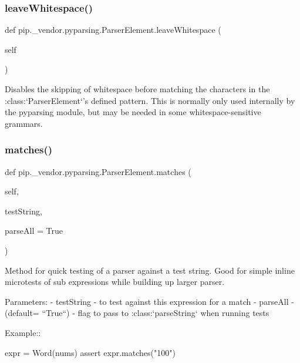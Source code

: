 \subsubsection{\texorpdfstring{leave\+Whitespace()}{leaveWhitespace()}}
{\footnotesize\ttfamily def pip.\+\_\+vendor.\+pyparsing.\+Parser\+Element.\+leave\+Whitespace (\begin{DoxyParamCaption}\item[{}]{self }\end{DoxyParamCaption})}

\begin{DoxyVerb}Disables the skipping of whitespace before matching the characters in the
:class:`ParserElement`'s defined pattern.  This is normally only used internally by
the pyparsing module, but may be needed in some whitespace-sensitive grammars.
\end{DoxyVerb}
 \mbox{\label{classpip_1_1__vendor_1_1pyparsing_1_1ParserElement_a084411e07bcb35c98555fbeb7bd617bf}} 
\subsubsection{\texorpdfstring{matches()}{matches()}}
{\footnotesize\ttfamily def pip.\+\_\+vendor.\+pyparsing.\+Parser\+Element.\+matches (\begin{DoxyParamCaption}\item[{}]{self,  }\item[{}]{test\+String,  }\item[{}]{parse\+All = {\ttfamily True} }\end{DoxyParamCaption})}

\begin{DoxyVerb}Method for quick testing of a parser against a test string. Good for simple
inline microtests of sub expressions while building up larger parser.

Parameters:
 - testString - to test against this expression for a match
 - parseAll - (default= ``True``) - flag to pass to :class:`parseString` when running tests

Example::

    expr = Word(nums)
    assert expr.matches("100")
\end{DoxyVerb}
 \mbox{\label{classpip_1_1__vendor_1_1pyparsing_1_1ParserElement_a11cd70d97a3da22fdeafb84aa5ac7628}} 
